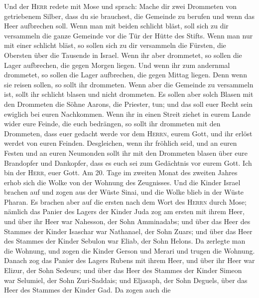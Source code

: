  Und der \textsc{Herr} redete mit Mose und sprach:
 Mache dir zwei Drommeten von getriebenem Silber, dass du
sie brauchest, die Gemeinde zu berufen und wenn das Heer aufbrechen
soll.  Wenn man mit beiden schlicht bläst, soll sich zu
dir versammeln die ganze Gemeinde vor die Tür der Hütte des Stifts.
 Wenn man nur mit einer schlicht bläst, so sollen sich zu
dir versammeln die Fürsten, die Obersten über die Tausende in Israel.
 Wenn ihr aber drommetet, so sollen die Lager aufbrechen,
die gegen Morgen liegen.  Und wenn ihr zum andernmal
drommetet, so sollen die Lager aufbrechen, die gegen Mittag liegen. Denn
wenn sie reisen sollen, so sollt ihr drommeten.  Wenn aber
die Gemeinde zu versammeln ist, sollt ihr schlicht blasen und nicht
drommeten.  Es sollen aber solch Blasen mit den Drommeten
die Söhne Aarons, die Priester, tun; und das soll euer Recht sein
ewiglich bei euren Nachkommen.  Wenn ihr in einen Streit
ziehet in eurem Lande wider eure Feinde, die euch bedrängen, so sollt
ihr drommeten mit den Drommeten, dass euer gedacht werde vor dem
\textsc{Herrn}, eurem Gott, und ihr erlöst werdet von euren Feinden.
 Desgleichen, wenn ihr fröhlich seid, und an euren Festen
und an euren Neumonden sollt ihr mit den Drommeten blasen über eure
Brandopfer und Dankopfer, dass es euch sei zum Gedächtnis vor eurem
Gott. Ich bin der \textsc{Herr}, euer Gott.  Am 20. Tage
im zweiten Monat des zweiten Jahres erhob sich die Wolke von der Wohnung
des Zeugnisses.  Und die Kinder Israel brachen auf und
zogen aus der Wüste Sinai, und die Wolke blieb in der Wüste Pharan.
 Es brachen aber auf die ersten nach dem Wort des
\textsc{Herrn} durch Mose;  nämlich das Panier des Lagers
der Kinder Juda zog am ersten mit ihrem Heer, und über ihr Heer war
Nahesson, der Sohn Amminadabs;  und über das Heer des
Stammes der Kinder Isaschar war Nathanael, der Sohn Zuars;
 und über das Heer des Stammes der Kinder Sebulon war
Eliab, der Sohn Helons.  Da zerlegte man die Wohnung, und
zogen die Kinder Gerson und Merari und trugen die Wohnung.
 Danach zog das Panier des Lagers Rubens mit ihrem Heer,
und über ihr Heer war Elizur, der Sohn Sedeurs;  und über
das Heer des Stammes der Kinder Simeon war Selumiel, der Sohn
Zuri-Saddais;  und Eljasaph, der Sohn Deguels, über das
Heer des Stammes der Kinder Gad.  Da zogen auch die
